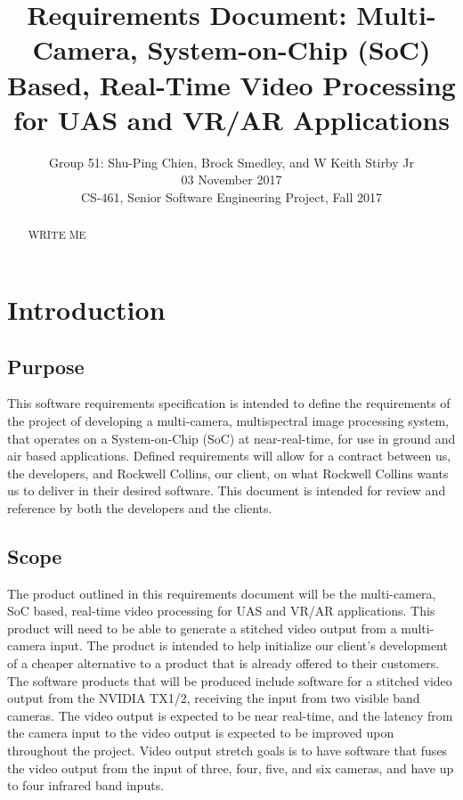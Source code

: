 \documentclass[letterpaper,10pt,serif,draftclsnofoot,onecolumn,compsoc,titlepage]{IEEEtran}
\title{Requirements Document: Multi-Camera, System-on-Chip (SoC) Based, Real-Time Video Processing for UAS and VR/AR Applications}
\author{Group 51: Shu-Ping Chien, Brock Smedley, and W Keith Stirby Jr \\ 03 November 2017 \\ CS-461, Senior Software Engineering Project, Fall 2017}
\begin{document}
\begin{titlepage}
\maketitle
\begin{abstract}

WRITE ME \\

\end{abstract}
\end{titlepage}
\newpage

\tableofcontents
\newpage

\section{Introduction}

\subsection{Purpose}

This software requirements specification is intended to define the requirements of the 
project of developing a multi-camera, multispectral image processing system, that 
operates on a System-on-Chip (SoC) at near-real-time, for use in ground and air based 
applications. Defined requirements will allow for a contract between us, the 
developers, and Rockwell Collins, our client, on what Rockwell Collins wants us to 
deliver in their desired software. This document is intended for review and reference 
by both the developers and the clients.\\

\subsection{Scope}

The product outlined in this requirements document will be the multi-camera, SoC based,
 real-time video processing for UAS and VR/AR applications. This product will need to 
 be able to generate a stitched video output from a multi-camera input. The product is 
 intended to help initialize our client's development of a cheaper alternative to a 
 product that is already offered to their customers.\\

The software products that will be produced include software for a stitched video output 
from the NVIDIA TX1/2, receiving the input from two visible band cameras. 
The video output is expected to be near real-time, and the latency from the camera 
input to the video output is expected to be improved upon throughout the project. Video 
output stretch goals is to have software that fuses the video output from the input of 
three, four, five, and six cameras, and have up to four infrared band inputs.\\
\end{document}
